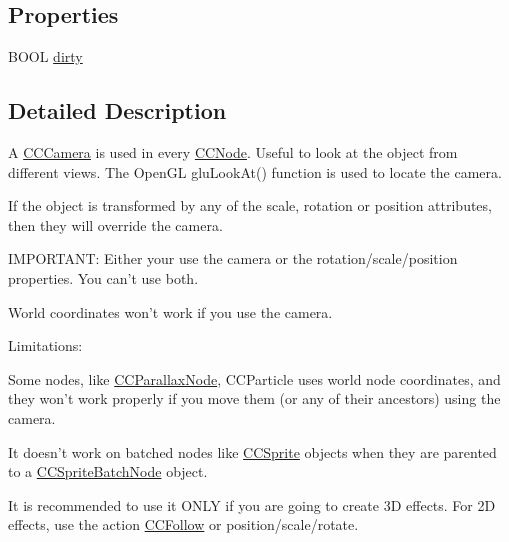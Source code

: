\subsection*{Properties}
\begin{DoxyCompactItemize}
\item 
B\-O\-O\-L \hyperlink{interface_c_c_camera_a692d41f24ecf5c3091d6ed248b800ee8}{dirty}
\end{DoxyCompactItemize}


\subsection{Detailed Description}
A \hyperlink{interface_c_c_camera}{C\-C\-Camera} is used in every \hyperlink{class_c_c_node}{C\-C\-Node}. Useful to look at the object from different views. The Open\-G\-L glu\-Look\-At() function is used to locate the camera.

If the object is transformed by any of the scale, rotation or position attributes, then they will override the camera. \begin{DoxyVerb}IMPORTANT: Either your use the camera or the rotation/scale/position properties. You can't use both.
\end{DoxyVerb}
 World coordinates won't work if you use the camera.

Limitations\-:


\begin{DoxyItemize}
\item Some nodes, like \hyperlink{interface_c_c_parallax_node}{C\-C\-Parallax\-Node}, C\-C\-Particle uses world node coordinates, and they won't work properly if you move them (or any of their ancestors) using the camera.
\end{DoxyItemize}


\begin{DoxyItemize}
\item It doesn't work on batched nodes like \hyperlink{class_c_c_sprite}{C\-C\-Sprite} objects when they are parented to a \hyperlink{interface_c_c_sprite_batch_node}{C\-C\-Sprite\-Batch\-Node} object.


\begin{DoxyItemize}
\item It is recommended to use it O\-N\-L\-Y if you are going to create 3\-D effects. For 2\-D effects, use the action \hyperlink{interface_c_c_follow}{C\-C\-Follow} or position/scale/rotate. 
\end{DoxyItemize}
\end{DoxyItemize}

